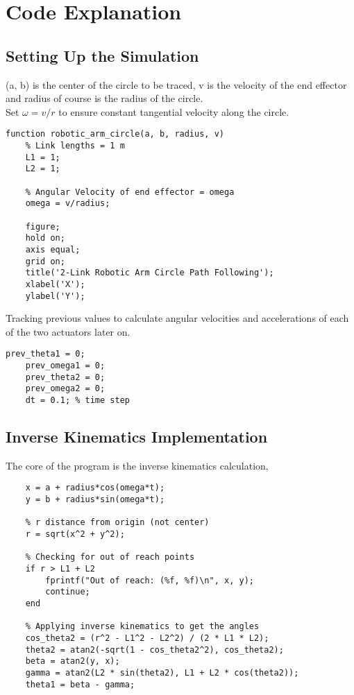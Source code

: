 \documentclass{article}
\begin{document}
\section*{Code Explanation}

\subsection*{Setting Up the Simulation}
(a, b) is the center of the circle to be traced, v is the velocity of the end effector and radius of course is the radius of the circle.\\
Set $\omega = v/r$ to ensure constant tangential velocity along the circle.
\begin{lstlisting}[style=Matlab-editor]
function robotic_arm_circle(a, b, radius, v)
    % Link lengths = 1 m 
    L1 = 1;
    L2 = 1;

    % Angular Velocity of end effector = omega
    omega = v/radius;

    figure;
    hold on;
    axis equal;
    grid on;
    title('2-Link Robotic Arm Circle Path Following');
    xlabel('X');
    ylabel('Y');
\end{lstlisting}

Tracking previous values to calculate angular velocities and accelerations of each of the two actuators later on.

\begin{lstlisting}[style=Matlab-editor]
    prev_theta1 = 0;
    prev_omega1 = 0;
    prev_theta2 = 0;
    prev_omega2 = 0;
    dt = 0.1; % time step
\end{lstlisting}

\subsection*{Inverse Kinematics Implementation}
The core of the program is the inverse kinematics calculation,

\begin{lstlisting}[style=Matlab-editor]
    % (x, y) is the coordinate of the end effector
    x = a + radius*cos(omega*t);
    y = b + radius*sin(omega*t);

    % r distance from origin (not center)
    r = sqrt(x^2 + y^2);

    % Checking for out of reach points
    if r > L1 + L2
        fprintf("Out of reach: (%f, %f)\n", x, y);
        continue;
    end

    % Applying inverse kinematics to get the angles
    cos_theta2 = (r^2 - L1^2 - L2^2) / (2 * L1 * L2);
    theta2 = atan2(-sqrt(1 - cos_theta2^2), cos_theta2);
    beta = atan2(y, x);
    gamma = atan2(L2 * sin(theta2), L1 + L2 * cos(theta2));
    theta1 = beta - gamma;
\end{lstlisting}
\end{document}
